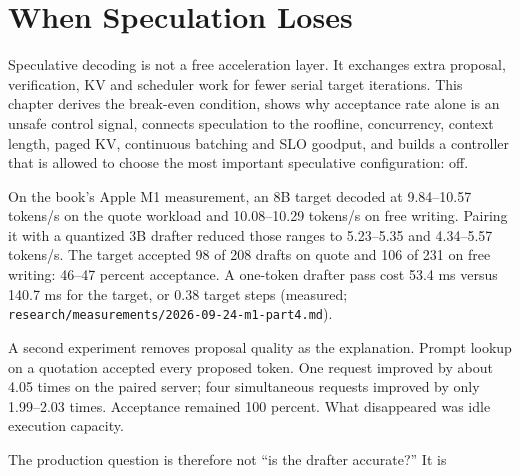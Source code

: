 \chapter{When Speculation Loses}\label{ch:when-speculation-loses}

\begin{ChapterIntent}
Speculative decoding is not a free acceleration layer. It exchanges extra proposal,
verification, KV and scheduler work for fewer serial target iterations. This chapter
derives the break-even condition, shows why acceptance rate alone is an unsafe control
signal, connects speculation to the roofline, concurrency, context length, paged KV,
continuous batching and SLO goodput, and builds a controller that is allowed to choose
the most important speculative configuration: off.
\end{ChapterIntent}


On the book's Apple M1 measurement, an 8B target decoded at 9.84--10.57 tokens/s on
the quote workload and 10.08--10.29 tokens/s on free writing. Pairing it with a
quantized 3B drafter reduced those ranges to 5.23--5.35 and 4.34--5.57 tokens/s.
The target accepted 98 of 208 drafts on quote and 106 of 231 on free writing:
46--47 percent acceptance. A one-token drafter pass cost 53.4 ms versus 140.7 ms
for the target, or 0.38 target steps
(measured; \texttt{research/measurements/2026-09-24-m1-part4.md}).

A second experiment removes proposal quality as the explanation. Prompt lookup on a
quotation accepted every proposed token. One request improved by about 4.05 times on
the paired server; four simultaneous requests improved by only 1.99--2.03 times.
Acceptance remained 100 percent. What disappeared was idle execution capacity.

The production question is therefore not ``is the drafter accurate?'' It is


